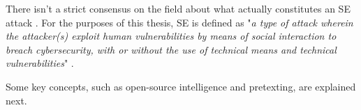 There isn't a strict consensus on the field about what actually constitutes an SE attack \citep{hatfieldSocialEngineeringCybersecurity2018a}. For the purposes of this thesis, SE is defined as "\textit{a type of attack wherein the attacker(s) exploit human vulnerabilities by means of social interaction to breach cybersecurity, with or without the use of technical means and technical vulnerabilities}" \citep{wangDefiningSocialEngineering2020}.

Some key concepts, such as open-source intelligence and pretexting, are explained next.






